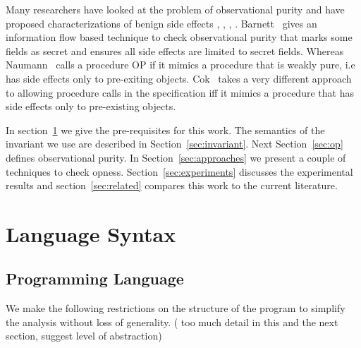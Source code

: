 \documentclass{llncs}
\begin{document}
Many researchers have looked at the problem of observational purity
and have proposed characterizations of benign side effects
\cite{naumann2007observational}, \cite{barnett2006allowing},
\cite{cok2008extensions},
\cite{finifter2008verifiable}. Barnett~\cite{barnett2006allowing}
gives an information flow based technique to check observational
purity that marks some fields as secret and ensures all side effects
are limited to secret fields. Whereas
Naumann~\cite{naumann2007observational} calls a procedure OP if it
mimics a procedure that is weakly pure, i.e has side effects only to
pre-exiting objects. Cok~\cite{cok2008extensions} takes a very
different approach to allowing procedure calls in the specification
iff it mimics a procedure that has side effects only to pre-existing
objects.

In section~\ref{sec:background} we give the pre-requisites for this
work. The semantics of the invariant we use are described in
Section~\ref{sec:invariant}. Next Section~\ref{sec:op} defines
observational purity. In Section~\ref{sec:approaches} we present a
couple of techniques to check opness. Section~\ref{sec:experiments}
discusses the experimental results and section~\ref{sec:related}
compares this work to the current literature.

\section{Language Syntax} \label{sec:background}

\subsection{Programming Language}
We make the following restrictions on the structure of the program to
simplify the analysis without loss of generality. ( too much detail in
this and the next section, suggest level of abstraction)
\end{document}
